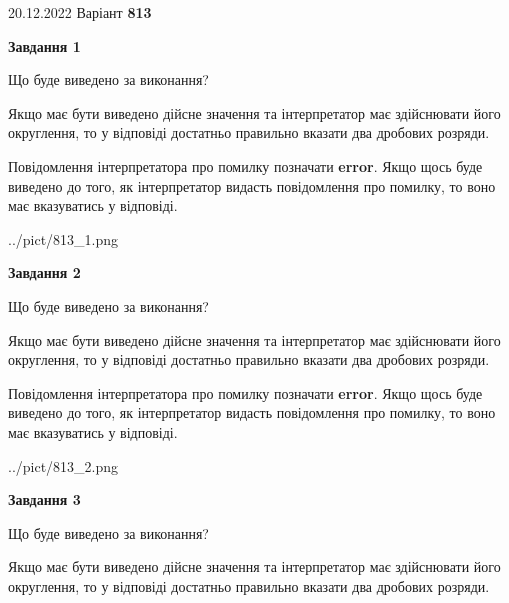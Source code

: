 \documentclass[12pt, ukrainian]{article}
\begin{document}
{20.12.2022 Варіант \No \textbf { 813 }\par}
{
\begin {Large}

{\begin {center}\textbf{Завдання 1}\end {center}}\par
Що буде виведено за виконання? \par

Якщо має бути виведено дійсне значення та інтерпретатор має здійснювати його округлення, 
то у відповіді достатньо правильно вказати два дробових розряди.

Повідомлення інтерпретатора про помилку позначати \textbf{error}.
Якщо щось буде виведено до того, як інтерпретатор видасть повідомлення про помилку, 
то воно має вказуватись у відповіді. \par

\begin{center}
	{../pict/813_1.png}
\end{center}
\newpage

{\begin {center}\textbf{Завдання 2}\end {center}}\par
Що буде виведено за виконання? \par

Якщо має бути виведено дійсне значення та інтерпретатор має здійснювати його округлення, 
то у відповіді достатньо правильно вказати два дробових розряди.

Повідомлення інтерпретатора про помилку позначати \textbf{error}.
Якщо щось буде виведено до того, як інтерпретатор видасть повідомлення про помилку, 
то воно має вказуватись у відповіді. \par

\begin{center}
	{../pict/813_2.png}
\end{center}
\newpage

{\begin {center}\textbf{Завдання 3}\end {center}}\par
Що буде виведено за виконання? \par

Якщо має бути виведено дійсне значення та інтерпретатор має здійснювати його округлення, 
то у відповіді достатньо правильно вказати два дробових розряди.


\end{Large}}
\end{document}

